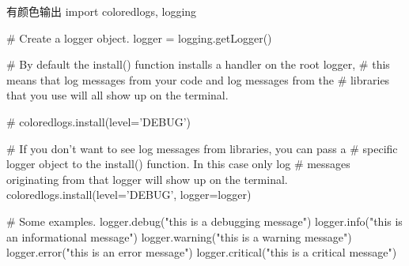 \documentclass[11pt]{article}
\begin{document}
\begin{Python}{有颜色输出}
import coloredlogs, logging

# Create a logger object.
logger = logging.getLogger()

# By default the install() function installs a handler on the root logger,
# this means that log messages from your code and log messages from the
# libraries that you use will all show up on the terminal.

# coloredlogs.install(level='DEBUG')

# If you don't want to see log messages from libraries, you can pass a
# specific logger object to the install() function. In this case only log
# messages originating from that logger will show up on the terminal.
coloredlogs.install(level='DEBUG', logger=logger)

# Some examples.
logger.debug("this is a debugging message")
logger.info("this is an informational message")
logger.warning("this is a warning message")
logger.error("this is an error message")
logger.critical("this is a critical message")
\end{Python}
\end{document}
